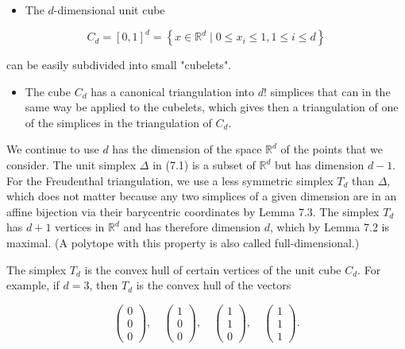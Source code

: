 \documentclass[12pt]{article}
\begin{document}
\begin{itemize}
  \item The $d$-dimensional unit cube
\end{itemize}

$$
C_{d}=[0,1]^{d}=\left\{x \in \mathbb{R}^{d} \mid 0 \leq x_{i} \leq 1,1 \leq i \leq d\right\}
$$

can be easily subdivided into small "cubelets".

\begin{itemize}
  \item The cube $C_{d}$ has a canonical triangulation into $d!$ simplices that can in the same way be applied to the cubelets, which gives then a triangulation of one of the simplices in the triangulation of $C_{d}$.
\end{itemize}

We continue to use $d$ has the dimension of the space $\mathbb{R}^{d}$ of the points that we consider. The unit simplex $\Delta$ in (7.1) is a subset of $\mathbb{R}^{d}$ but has dimension $d-1$. For the Freudenthal triangulation, we use a less symmetric simplex $T_{d}$ than $\Delta$, which does not matter because any two simplices of a given dimension are in an affine bijection via their barycentric coordinates by Lemma 7.3. The simplex $T_{d}$ has $d+1$ vertices in $\mathbb{R}^{d}$ and has therefore dimension $d$, which by Lemma 7.2 is maximal. (A polytope with this property is also called full-dimensional.)

The simplex $T_{d}$ is the convex hull of certain vertices of the unit cube $C_{d}$. For example, if $d=3$, then $T_{d}$ is the convex hull of the vectors

\[
\left(\begin{array}{l}
0  \tag{7.24}\\
0 \\
0
\end{array}\right), \quad\left(\begin{array}{l}
1 \\
0 \\
0
\end{array}\right), \quad\left(\begin{array}{l}
1 \\
1 \\
0
\end{array}\right), \quad\left(\begin{array}{l}
1 \\
1 \\
1
\end{array}\right) .
\]
\end{document}
